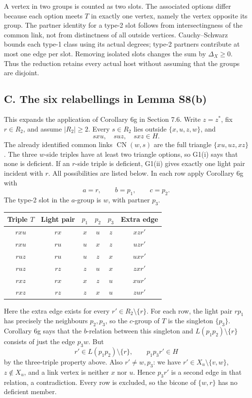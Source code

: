 A vertex in two groups is counted as two slots. The associated options differ because each option meets $T$ in exactly one vertex, namely the vertex opposite its group. The partner identity for a type-2 slot follows from intersectingness of the common link, not from distinctness of all outside vertices. Cauchy--Schwarz bounds each type-1 class using its actual degrees; type-2 partners contribute at most one edge per slot. Removing isolated slots changes the sum by $\Delta_X\ge0$. Thus the reduction retains every actual host without assuming that the groups are disjoint.

\subsection*{C. The six relabellings in Lemma S8(b)}
This expands the application of Corollary 6g in Section 7.6.
Write $z=z^*$, fix $r\in R_2$, and assume $|R_2|\ge2$.
Every $s\in R_2$ lies outside $\{x,u,z,w\}$, and
\[
 sxu,\quad suz,\quad sxz\in H.
\]
The already identified common links $\operatorname{CN}(w,s)$ are the full triangle $\{xu,uz,xz\}$. The three $w$-side triples have at least two triangle options, so G1(i) says that none is deficient. If an $r$-side triple is deficient, G1(ii) gives exactly one light pair incident with $r$. All possibilities are listed below. In each row apply Corollary 6g with
\[
 a=r,\qquad b=p_1,\qquad c=p_2.
\]
The type-2 slot in the $a$-group is $w$, with partner $p_3$.
\begin{center}
\begin{tabular}{cccccc}
\toprule
Triple $T$ & Light pair & $p_1$ & $p_2$ & $p_3$ & Extra edge\\
\midrule
$rxu$ & $rx$ & $x$ & $u$ & $z$ & $xzr'$\\
$rxu$ & $ru$ & $u$ & $x$ & $z$ & $uzr'$\\
$ruz$ & $ru$ & $u$ & $z$ & $x$ & $uxr'$\\
$ruz$ & $rz$ & $z$ & $u$ & $x$ & $zxr'$\\
$rxz$ & $rx$ & $x$ & $z$ & $u$ & $xur'$\\
$rxz$ & $rz$ & $z$ & $x$ & $u$ & $zur'$\\
\bottomrule
\end{tabular}
\end{center}
Here the extra edge exists for every $r'\in R_2\setminus\{r\}$.
For each row, the light pair $rp_1$ has precisely the neighbours $p_2,p_3$, so the $c$-group of $T$ is the singleton $\{p_3\}$. Corollary 6g says that the $b$-relation between this singleton and $L(p_1p_2)\setminus\{r\}$ consists of just the edge $p_3w$. But
\[
 r'\in L(p_1p_2)\setminus\{r\},\qquad p_1p_3r'\in H
\]
by the three-triple property above. Also $r'\ne w,p_3$: we have $r'\in X_u\setminus\{v,w\}$, $z\notin X_u$, and a link vertex is neither $x$ nor $u$. Hence $p_3r'$ is a second edge in that relation, a contradiction. Every row is excluded, so the bicone of $\{w,r\}$ has no deficient member.

